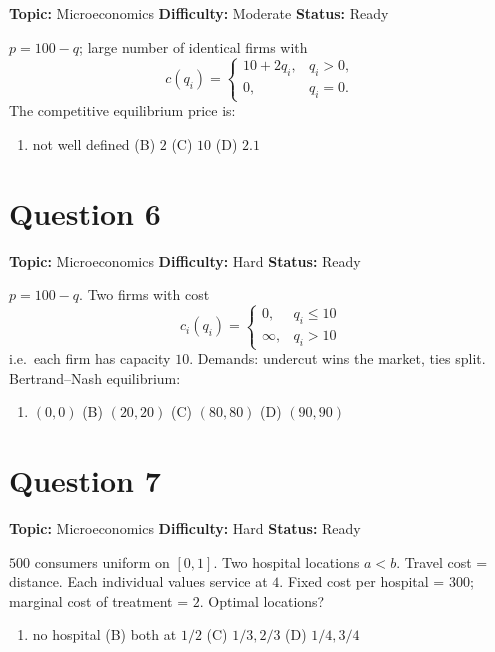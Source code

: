 \documentclass[11pt]{article}
\begin{document}
\noindent\textbf{Topic:} Microeconomics \quad \textbf{Difficulty:} Moderate \quad \textbf{Status:} Ready



$p=100-q$; large number of identical firms with
\[
c(q_i)=\begin{cases}10+2q_i, & q_i>0,\\ 0, & q_i=0.\end{cases}
\]
The competitive equilibrium price is:
\begin{enumerate}[label=(\Alph*)]
\item not well defined \quad (B) $2$ \quad (C) $10$ \quad (D) $2.1$
\end{enumerate}

\newpage

\section*{Question 6}


\noindent\textbf{Topic:} Microeconomics \quad \textbf{Difficulty:} Hard \quad \textbf{Status:} Ready



$p=100-q$. Two firms with cost
\[
c_i(q_i)=\begin{cases}0, & q_i\le 10\\ \infty, & q_i>10\end{cases}
\]
i.e.\ each firm has capacity $10$. Demands: undercut wins the market, ties split. Bertrand--Nash equilibrium:
\begin{enumerate}[label=(\Alph*)]
\item $(0,0)$ \quad (B) $(20,20)$ \quad (C) $(80,80)$ \quad (D) $(90,90)$
\end{enumerate}

\newpage

\section*{Question 7}


\noindent\textbf{Topic:} Microeconomics \quad \textbf{Difficulty:} Hard \quad \textbf{Status:} Ready



$500$ consumers uniform on $[0,1]$. Two hospital locations $a<b$. Travel cost = distance. Each individual values service at $4$. Fixed cost per hospital = $300$; marginal cost of treatment = $2$. Optimal locations?
\begin{enumerate}[label=(\Alph*)]
\item no hospital \quad (B) both at $1/2$ \quad (C) $1/3,2/3$ \quad (D) $1/4,3/4$
\end{enumerate}
\end{document}
